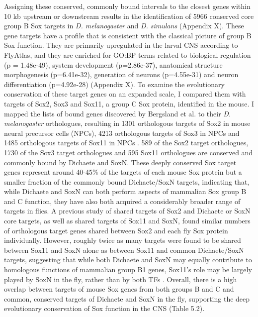 Assigning these conserved, commonly bound intervals to the closest genes within 10 kb upstream or downstream results in the identification of 5966 conserved core group B Sox targets in \emph{D. melanogaster} and \emph{D. simulans} (Appendix X). These gene targets have a profile that is consistent with the classical picture of group B Sox function. They are primarily upregulated in the larval CNS according to FlyAtlas, and they are enriched for GO:BP terms related to biological regulation (p = 1.48e-49), system development (p=2.86e-37), anatomical structure morphogenesis (p=6.41e-32), generation of neurons (p=4.55e-31) and neuron differentiation (p=4.92e-28) (Appendix X). To examine the evolutionary conservation of these target genes on an expanded scale, I compared them with targets of Sox2, Sox3 and Sox11, a group C Sox protein, identified in the mouse. I mapped the lists of bound genes discovered by Bergsland et al. to their \emph{D. melanogaster} orthologues, resulting in 1301 orthologous targets of Sox2 in mouse neural precursor cells (NPCs), 4213 orthologous targets of Sox3 in NPCs and 1485 orthologous targets of Sox11 in NPCs \citep{bergsland_sequentially_2011}. 589 of the Sox2 target orthologues, 1730 of the Sox3 target orthologues and 595 Sox11 orthologues are conserved and commonly bound by Dichaete and SoxN. These deeply conserved Sox target genes represent around 40-45\% of the targets of each mouse Sox protein but a smaller fraction of the commonly bound Dichaete/SoxN targets, indicating that, while Dichaete and SoxN can both perform aspects of mammalian Sox group B and C function, they have also both acquired a considerably broader range of targets in flies. A previous study of shared targets of Sox2 and Dichaete or SoxN core targets, as well as shared targets of Sox11 and SoxN, found similar numbers of orthologous target genes shared between Sox2 and each fly Sox protein individually. However, roughly twice as many targets were found to be shared between Sox11 and SoxN alone as between Sox11 and common Dichaete/SoxN targets, suggesting that while both Dichaete and SoxN may equally contribute to homologous functions of mammalian group B1 genes, Sox11’s role may be largely played by SoxN in the fly, rather than by both TFs \citep{ferrero_soxneuro_2014}. Overall, there is a high overlap between targets of mouse Sox genes from both groups B and C and common, conserved targets of Dichaete and SoxN in the fly, supporting the deep evolutionary conservation of Sox function in the CNS (Table 5.2).

